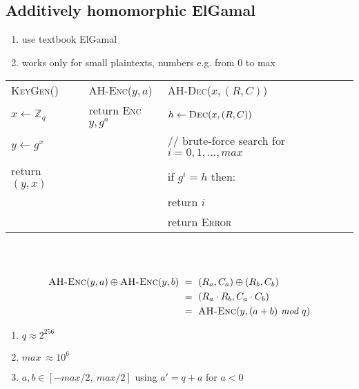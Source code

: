 \documentclass{report}
\begin{document}
\begin{adjustwidth}{2em}{2em}
	\subsection{Additively homomorphic ElGamal}
	\begin{adjustwidth}{2em}{}
		\begin{enumerate}[-]
			\item use textbook ElGamal
			\item works only for small plaintexts, numbers e.g. from 0 to max
		\end{enumerate}
		\begin{tabular}{lll}
			\textsc{KeyGen}() & \textsc{AH-Enc}($y,a$) & \textsc{AH-Dec}($x, (R,C)$) \\
			\indent $x \leftarrow \mathbb{Z}_q$ & \indent return \textsc{Enc}$y, g^a$ & \indent $h \leftarrow \textsc{Dec}(x, (R,C))$ \\
			\indent $y \leftarrow g^x$ & & \indent // brute-force search for  $i = 0,1,..., max$\\
			\indent return $(y,x)$ & & \indent if $g^i = h$ then:\\
			& & \indent \indent return $i$ \\
			& & \indent return \textsc{Error}
		\end{tabular} \\
		\hfill \\
		\begin{align*}
			\textsc{AH-Enc}(y, a) \oplus \textsc{AH-Enc}(y,b) \ & = \ (R_a, C_a) \oplus (R_b, C_b) \\
			& = \ (R_a \cdot R_b, C_a \cdot C_b) \\
			& = \ \textsc{AH-Enc}(y, (a+b) \textit{ mod } q)
		\end{align*}
		\begin{enumerate}[...]
			\item $q \approx 2^{256}$
			\item $max \ \approx 10^6$
			\item $a,b \in [-max/2, \ max/2]$ using $a' = q + a$ for $a<0$
		\end{enumerate}
	\end{adjustwidth}
\end{adjustwidth}
\end{document}
